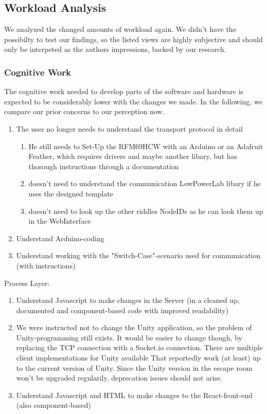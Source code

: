 \subsection{Workload Analysis}
We analyzed the changed amounts of workload again. 
We didn't have the possibilty to test our findings, so the listed views are highly subjective 
and should only be interpeted as the authors impressions, backed by our research.
\subsubsection{Cognitive Work}
The cognitive work needed to develop parts 
of the software and hardware is expected to be considerably lower with the changes we made.
In the following, we compare our prior concerns to our perception now.
\begin{enumerate}
    \item The user no longer needs to understand the transport protocol in detail
    \begin{enumerate}
        \item 
        He still needs to Set-Up the RFM69HCW with an Arduino or an Adafruit Feather, 
        which requires drivers and maybe another libary, but has thorough instructions through a documentation
        \item doesn't need to understand the communication LowPowerLab libary if he uses the designed template
        \item doesn't need to look up the other riddles NodeIDs as he can look them up in the WebInterface
    \end{enumerate}   
    \item Understand Arduino-coding 
    \item Understand working with the "Switch-Case"-scenario used for communication (with instructions)
\end{enumerate}  
Process Layer:
\begin{enumerate}
    \item Understand Javascript to make changes in the Server (in a cleaned up, documented and component-based code with improved readability)
    \item 
    We were instructed not to change the Unity application, so the problem of Unity-programming still exists. 
    It would be easier to change though, by replacing the TCP connection with a Socket.io connection. 
    There are multiple client implementations for Unity available \parencite{socketioUnity1, socketioUnity2,socketioUnity3}
    That reportedly work (at least) up to the current version of Unity. 
    Since the Unity version in the escape room won't be upgraded regularily, deprecation issues should not arise.
    \item Understand Javascript and HTML to make changes to the React-front-end (also component-based) 
\end{enumerate}  
